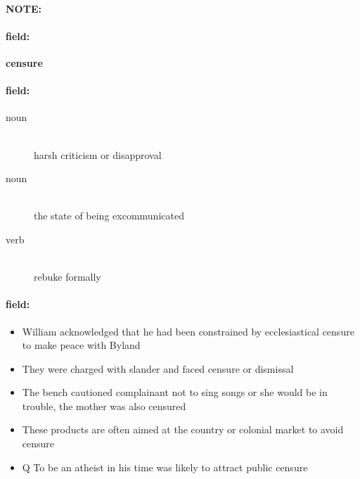 \documentclass[12pt]{article}
\newenvironment{note}{\paragraph{NOTE:}}{}
\newenvironment{field}{\paragraph{field:}}{}
\begin{document}
\begin{note}
\begin{field}
\textbf{\large censure}
\end{field}


\begin{field}
\begin{description}
\item[noun] \hfill \\ 
harsh criticism or disapproval

\item[noun] \hfill \\ 
the state of being excommunicated

\item[verb] \hfill \\ 
rebuke formally

\end{description}
\end{field}

\begin{field}
\begin{itemize}
\item William acknowledged that he had been constrained by ecclesiastical censure to make peace with Byland
\item They were charged with slander and faced censure or dismissal
\item The bench cautioned complainant not to sing songs or she would be in trouble, the mother was also censured
\item These products are often aimed at the country or colonial market to avoid censure
\item Q To be an atheist in his time was likely to attract public censure
\end{itemize}
\end{field}
\end{note}
\end{document}

